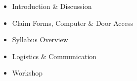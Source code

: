 \def\dMon{Mon, 01/11}
\def\dTues{Tues, 01/12}
\def\dWed{Wed, 01/13}
\def\dThur{Thur, 01/14}
\def\dFri{Fri, 01/15}
\def\dSat{Sat, 01/16}
\def\dSun{Sun, 01/17}
\placeDate



\begin{itemize}[noitemsep,topsep=0pt,leftmargin=*]
      \item Introduction \& Discussion
      \item Claim Forms, Computer \& Door Access
      \item Syllabus Overview
      \item Logistics \& Communication
      \item Workshop
\end{itemize}
\vspace{1em}
